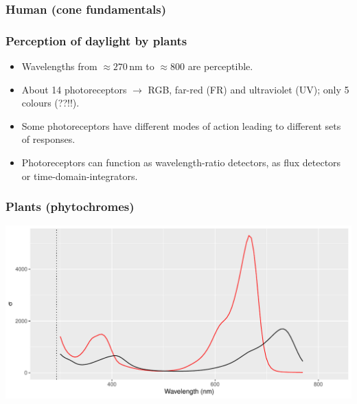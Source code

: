 \documentclass[11pt]{beamer}\usepackage[]{graphicx}\usepackage[]{xcolor}
\makeatletter
\newenvironment{kframe}{%
 \def\at@end@of@kframe{}%
 \ifinner\ifhmode%
  \def\at@end@of@kframe{\end{minipage}}%
  \begin{minipage}{\columnwidth}%
 \fi\fi%
 \def\FrameCommand##1{\hskip\@totalleftmargin \hskip-\fboxsep
 \colorbox{shadecolor}{##1}\hskip-\fboxsep
     \hskip-\linewidth \hskip-\@totalleftmargin \hskip\columnwidth}%
 \MakeFramed {\advance\hsize-\width
   \@totalleftmargin\z@ \linewidth\hsize
   \@setminipage}}%
 {\par\unskip\endMakeFramed%
 \at@end@of@kframe}
\newenvironment{knitrout}{}{} %
\makeatother
\begin{document}
\begin{frame}
\frametitle{Human (cone fundamentals)}
\begin{knitrout}\scriptsize
{}\color{fgcolor}\begin{kframe}


{\ttfamily\noindent\bfseries{}}\end{kframe}
\end{knitrout}
\end{frame}

\begin{frame}
\frametitle{Perception of daylight by plants}
\begin{itemize}
\item Wavelengths from $\approx 270$\,nm to $\approx 800$ are perceptible.
\item About 14 photoreceptors $\rightarrow$ RGB, far-red (FR) and ultraviolet (UV); only 5 colours (??!!).
\item Some photoreceptors have different modes of action leading to different sets of responses.
\item Photoreceptors can function as wavelength-ratio detectors, as flux detectors or time-domain-integrators.
\end{itemize}
\end{frame}

\begin{frame}
\frametitle{Plants (phytochromes)}
\begin{knitrout}\scriptsize
{}\color{fgcolor}

{\centering \includegraphics[width=.95\textwidth]{figure/pos-plant-vision-0-1} 

}


\end{knitrout}
\end{frame}
\end{document}
